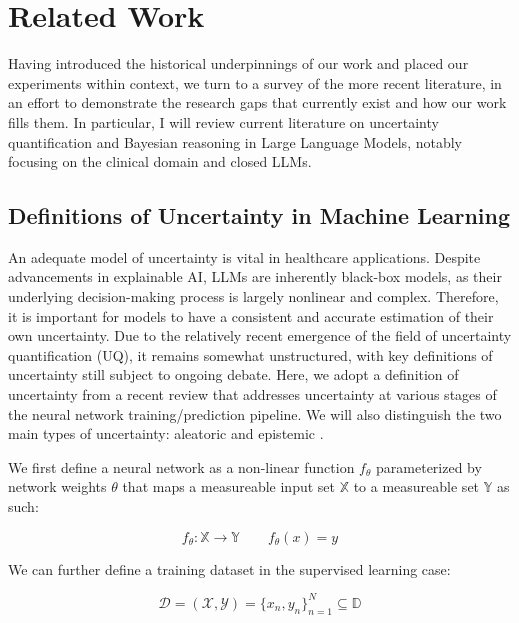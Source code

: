 \chapter{Related Work} \label{chapter:related-work}
Having introduced the historical underpinnings of our work and placed our experiments within context, we turn to a survey of the more recent literature, in an effort to demonstrate the research gaps that currently exist and how our work fills them. In particular, I will review current literature on uncertainty quantification and Bayesian reasoning in Large Language Models, notably focusing on the clinical domain and closed LLMs. 

\section{Definitions of Uncertainty in Machine Learning}
An adequate model of uncertainty is vital in healthcare applications. Despite advancements in explainable AI, LLMs are inherently black-box models, as their underlying decision-making process is largely nonlinear and complex. Therefore, it is important for models to have a consistent and accurate estimation of their own uncertainty. Due to the relatively recent emergence of the field of uncertainty quantification (UQ), it remains somewhat unstructured, with key definitions of uncertainty still subject to ongoing debate. Here, we adopt a definition of uncertainty from a recent review that addresses uncertainty at various stages of the neural network training/prediction pipeline. We will also distinguish the two main types of uncertainty: aleatoric and epistemic \citep{kiureghianAleatoryEpistemicDoes2009}. 

We first define a neural network as a non-linear function $f_{\theta}$ parameterized by network weights $\theta$ that maps a measureable input set $\mathbb{X}$ to a measureable set $\mathbb{Y}$ as such:

\begin{equation} \label{eq:nn}
f_{\theta}:\mathbb{X} \rightarrow \mathbb{Y} \qquad f_{\theta}(x) = y
\end{equation}

We can further define a training dataset in the supervised learning case:

\begin{equation} \label{eq:train-data}
\mathcal{D} = (\mathcal{X},\mathcal{Y}) = \{x_n, y_n\}_{n=1}^{N} \subseteq \mathbb{D}
\end{equation}

